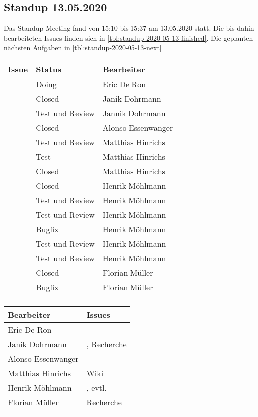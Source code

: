 	\subsection{Standup 13.05.2020}
	Das Standup-Meeting fand von 15:10 bis 15:37 am 13.05.2020 statt. Die bis dahin bearbeiteten Issues finden sich in \autoref{tbl:standup-2020-05-13-finished}. Die geplanten nächsten Aufgaben in \autoref{tbl:standup-2020-05-13-next}
		\begin{tabularx}{0.75\textwidth}{c|X|X}
			Issue 			& Status 			& Bearbeiter\\
			\hline
			\issueref{23} 	& Doing 			& Eric De Ron\\
			\issueref{39} 	& Closed 			& Janik Dohrmann\\
			\issueref{57} 	& Test und Review 	& Jannik Dohrmann\\
			\issueref{49} 	& Closed 			& Alonso Essenwanger\\
			\issueref{38} 	& Test und Review	& Matthias Hinrichs\\
			\issueref{53} 	& Test 				& Matthias Hinrichs\\
			\issueref{52} 	& Closed 			& Matthias Hinrichs\\
			\issueref{38} 	& Closed 			& Henrik Möhlmann\\
			\issueref{53} 	& Test und Review 	& Henrik Möhlmann\\
			\issueref{39} 	& Test und Review	& Henrik Möhlmann\\
			\issueref{57} 	& Bugfix 			& Henrik Möhlmann\\
			\issueref{60} 	& Test und Review 	& Henrik Möhlmann\\
			\issueref{49} 	& Test und Review 	& Henrik Möhlmann\\
			\issueref{53} 	& Closed 			& Florian Müller\\
			\issueref{60} 	& Bugfix 			& Florian Müller\\
			\hline
			\caption{bearbeitete Issues}
			\label{tbl:standup-2020-05-13-finished}
		\end{tabularx}
		\begin{tabularx}{0.75\textwidth}{X|X}
			Bearbeiter 			& Issues\\
			\hline
			Eric De Ron			& \issueref{23}\\
			Janik Dohrmann		& \issueref{61}, Recherche\\
			Alonso Essenwanger	& \issueref{46}\\
			Matthias Hinrichs	& Wiki\\
			Henrik Möhlmann		& \issueref{40}, evtl. \issueref{54}\\
			Florian Müller		& Recherche\\
			\hline
			\caption{nächste Aufgaben}
			\label{tbl:standup-2020-05-13-next}
		\end{tabularx}

